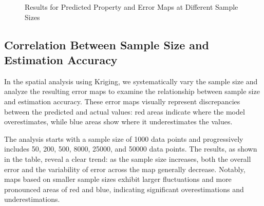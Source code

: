 \documentclass{swmcmthesis}
\begin{document}
\begin{figure}[h!t]

\caption{Results for Predicted Property and Error Maps at Different Sample Sizes}
\label{fig:four_per_row_23}
\end{figure}

\subsection{Correlation Between Sample Size and Estimation Accuracy}

In the spatial analysis using Kriging, we systematically vary the sample size and analyze the resulting error maps to examine the relationship between sample size and estimation accuracy. These error maps visually represent discrepancies between the predicted and actual values: red areas indicate where the model overestimates, while blue areas show where it underestimates the values.

The analysis starts with a sample size of 1000 data points and progressively includes 50, 200, 500, 8000, 25000, and 50000 data points. The results, as shown in the table, reveal a clear trend: as the sample size increases, both the overall error and the variability of error across the map generally decrease. Notably, maps based on smaller sample sizes exhibit larger fluctuations and more pronounced areas of red and blue, indicating significant overestimations and underestimations.
\end{document}
